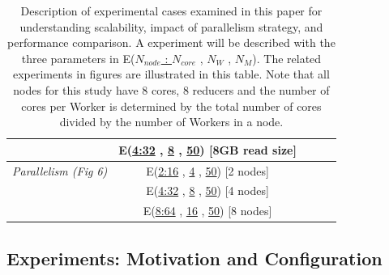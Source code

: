 \documentclass{acm_proc_article-sp}
\begin{document}
\begin{center}
\begin{table}[ht]
\begin{tabular}{|c|c|c|c|c|}
&E(\underline{4:32} , \underline{8} , \underline{50}) [8GB read size] \\
\hline
\it{Parallelism} (Fig 6) &E(\underline{2:16} , \underline{4} , \underline{50}) [2 nodes] \\
&E(\underline{4:32} , \underline{8} , \underline{50}) [4 nodes] \\
&E(\underline{8:64} , \underline{16} , \underline{50}) [8 nodes]\\
 \hline
 \end{tabular}
 \hfill{}
 \caption{Description of experimental cases examined in this paper for understanding scalability, impact of parallelism strategy, and performance comparison.  A experiment will be described with the three parameters in E(\underline{$N_{node}$ : $N_{core}$} , \underline{$N_W$} , \underline{$N_M$}).  The related experiments in figures are illustrated in this table.  Note that all nodes for this study have 8 cores, 8 reducers and the number of cores per Worker is determined by the total number of cores divided by the number of Workers in a node.}
    \label{table:exp-description} 
\end{table}
\end{center}





\subsection{Experiments: Motivation and Configuration}


\end{document}
